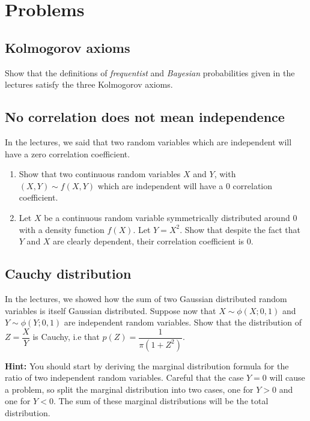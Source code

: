 \section{Problems}

\subsection{Kolmogorov axioms}

Show that the definitions of \emph{frequentist} and \emph{Bayesian} probabilities given in the lectures satisfy the three Kolmogorov axioms. 

\subsection{No correlation does not mean independence}

In the lectures, we said that two random variables which are independent will have a zero correlation coefficient. 

\begin{enumerate}
    \item Show that two continuous random variables $X$ and $Y$, with $(X,Y)\sim f(X,Y)$ which are independent will have a 0 correlation coefficient. 
    \item Let $X$ be a continuous random variable symmetrically distributed around 0 with a density function $f(X)$. Let $Y=X^{2}$. Show that despite the fact that $Y$ and $X$ are clearly dependent, their correlation coefficient is 0. 
\end{enumerate}

\subsection{Cauchy distribution}

In the lectures, we showed how the sum of two Gaussian distributed random variables is itself Gaussian distributed. Suppose now that $X\sim \phi(X;0,1)$ and  $Y\sim \phi(Y;0,1)$ are independent random variables. Show that the distribution of $Z=\dfrac{X}{Y}$ is Cauchy, i.e that $p(Z) = \dfrac{1}{\pi(1+Z^2)}$.

\textbf{Hint:} You should start by deriving the marginal distribution formula for the ratio of two independent random variables. Careful that the case $Y=0$ will cause a problem, so split the marginal distribution into two cases, one for $Y>0$ and one for $Y<0$. The sum of these marginal distributions will be the total distribution. 

